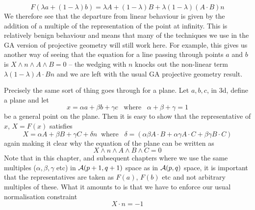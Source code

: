 %
\begin{equation}
F(\lambda a + (1-\lambda)b) = \lambda A + (1-\lambda)B +
\lambda(1-\lambda)(A\cdot B) n \label{lincomb}
\end{equation}
%
We therefore see that the departure from linear behaviour
is given by the addition of a multiple of the representation of the point at
infinity. This is relatively benign behaviour and means
that many of the techniques we use in the GA version of
projective geometry will still work here. For example,
this gives us another way of seeing that the equation for
a line passing through points $a$ and $b$ is $X\wedge n
\wedge A\wedge B=0$ -- the wedging with $n$ knocks out the
non-linear term $\lambda(1-\lambda)A\cdot B n $ and we are
left with the usual GA projective geometry result.

Precisely the same sort of thing goes through for a
plane. Let $a,b,c$, in 3d,  define a plane and let
%
\[ x = \alpha a + \beta b + \gamma c \;\;\; \mbox{where}\;\;\; \alpha + \beta + \gamma = 1  \]
%
be a general point on the plane. Then it is easy to show
that the representative of $x$, $X=F(x)$ satisfies
%
\begin{equation}
   X = \alpha A + \beta B + \gamma C + \delta n \;\;\mbox{where}\;\;\; \delta = (\alpha\beta A\cdot B + \alpha \gamma A\cdot C + \beta\gamma B\cdot C)
\end{equation}
%
again making it clear why the equation of the plane
can be written as
%
\[ X\wedge  n \wedge A \wedge B \wedge C =0 \]
%
Note that in this chapter, and subsequent chapters  where
we use the same multiples ($\alpha, \beta, \gamma$ etc)
in ${\mathcal{A}}(p+1,q+1)$ space as in ${\mathcal{A}}(p,q)$ space,
it is important that the representatives are taken as
$F(a)$, $F(b)$ etc and not arbitrary multiples of these.
What it amounts to is that we have to enforce
our usual normalisation constraint
%
\begin{equation}
 X\cdot n  = -1
 \end{equation}
 
